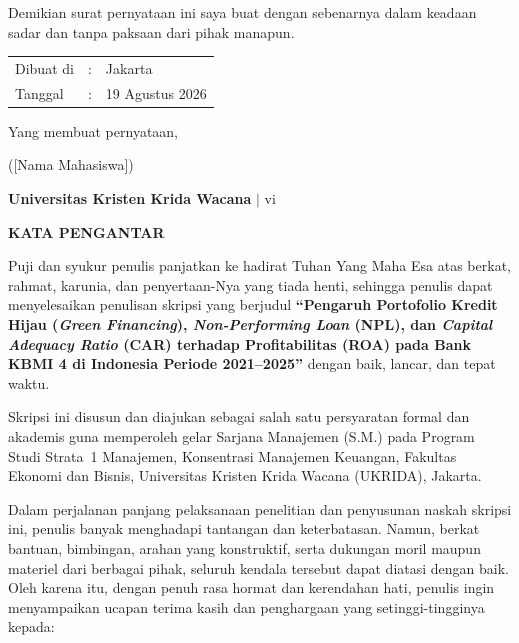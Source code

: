\documentclass[12pt,a4paper]{article}
\newcommand{\ukrida}{Universitas Kristen Krida Wacana}
\newcommand{\nahamahasiswa}{[Nama Mahasiswa]}
\numberwithin{equation}{section}
\begin{document}
\vspace{0.3cm}
\noindent
Demikian surat pernyataan ini saya buat dengan sebenarnya dalam keadaan sadar dan tanpa paksaan dari pihak manapun.

\vspace{0.8cm}
\noindent
\begin{tabular}{lll}
  Dibuat di & : & Jakarta \\
  Tanggal   & : & 19 Agustus 2026 \\
\end{tabular}

\vspace{0.4cm}
\noindent Yang membuat pernyataan,

\vspace{2.2cm}
\noindent (\nahamahasiswa)

\vfill
\begin{flushright}
  \footnotesize\textbf{\ukrida} $|$ vi
\end{flushright}

\newpage
\thispagestyle{frontmatter}
\begin{center}
  {\large\bfseries KATA PENGANTAR}
\end{center}

\vspace{0.5cm}
\noindent
Puji dan syukur penulis panjatkan ke hadirat Tuhan Yang Maha Esa atas berkat, rahmat, karunia, dan penyertaan-Nya yang tiada henti, sehingga penulis dapat menyelesaikan penulisan skripsi yang berjudul \textbf{``Pengaruh Portofolio Kredit Hijau (\emph{Green Financing}), \emph{Non-Performing Loan} (NPL), dan \emph{Capital Adequacy Ratio} (CAR) terhadap Profitabilitas (ROA) pada Bank KBMI 4 di Indonesia Periode 2021--2025''} dengan baik, lancar, dan tepat waktu.

\noindent
Skripsi ini disusun dan diajukan sebagai salah satu persyaratan formal dan akademis guna memperoleh gelar Sarjana Manajemen (S.M.) pada Program Studi Strata~1 Manajemen, Konsentrasi Manajemen Keuangan, Fakultas Ekonomi dan Bisnis, Universitas Kristen Krida Wacana (UKRIDA), Jakarta.

\noindent
Dalam perjalanan panjang pelaksanaan penelitian dan penyusunan naskah skripsi ini, penulis banyak menghadapi tantangan dan keterbatasan. Namun, berkat bantuan, bimbingan, arahan yang konstruktif, serta dukungan moril maupun materiel dari berbagai pihak, seluruh kendala tersebut dapat diatasi dengan baik. Oleh karena itu, dengan penuh rasa hormat dan kerendahan hati, penulis ingin menyampaikan ucapan terima kasih dan penghargaan yang setinggi-tingginya kepada:
\end{document}
